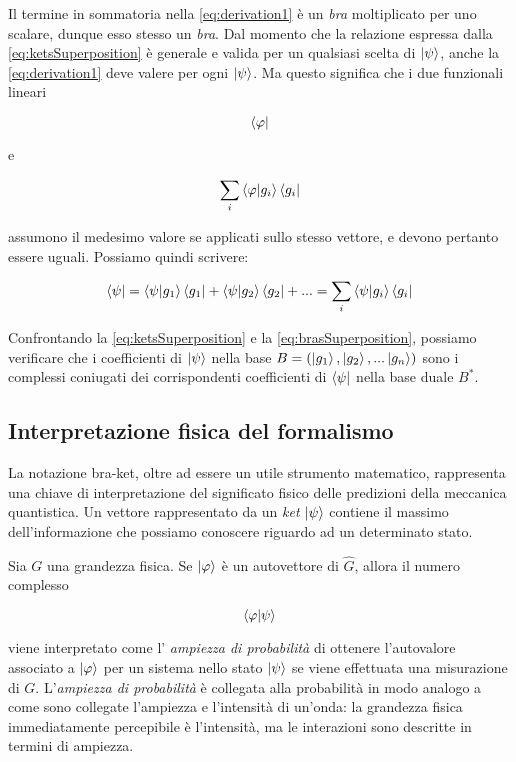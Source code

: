 Il termine in sommatoria nella \eqref{eq:derivation1} \`e un \textit{bra} moltiplicato per uno scalare, dunque esso stesso un \textit{bra}. Dal momento che la relazione espressa dalla \eqref{eq:ketsSuperposition} \`e generale e valida per un qualsiasi scelta di $\ket{\psi}$, anche la \eqref{eq:derivation1} deve valere per ogni $\ket{\psi}$. Ma questo significa che i due funzionali lineari

	\[
		\bra{\varphi}
	\]

e

	\[
		\sum_i \braket{\varphi}{g_i} \bra{g_i}
	\]


assumono il medesimo valore se applicati sullo stesso vettore, e devono pertanto essere uguali. Possiamo quindi scrivere:

	\begin{equation} \label{eq:brasSuperposition}
		\bra{\psi} = \braket{\psi}{g_1} \bra{g_1} + \braket{\psi}{g_2} \bra{g_2} + ... = \sum_i \braket{\psi}{g_i} \bra{g_i}
	\end{equation}

Confrontando la \eqref{eq:ketsSuperposition} e la \eqref{eq:brasSuperposition}, possiamo verificare che i coefficienti di $\ket{\psi}$ nella base $B = (\ket{g_1}, \ket{g_2},... \ket{g_n})$ sono i complessi coniugati dei corrispondenti coefficienti di $\bra{\psi}$ nella base duale $B^*$.

\subsection{Interpretazione fisica del formalismo}

La notazione bra-ket, oltre ad essere un utile strumento matematico, rappresenta una chiave di interpretazione del significato fisico delle predizioni della meccanica quantistica. Un vettore rappresentato da un \textit{ket} $\ket{\psi}$ contiene il massimo dell'informazione che possiamo conoscere riguardo ad un determinato stato. 

Sia $G$ una grandezza fisica. Se $\ket{\varphi}$ \`e un autovettore di $\hat{G}$, allora il numero complesso 

	\[
		\braket{\varphi}{\psi}
	\]

viene interpretato come l' \textit{ampiezza di probabilità} di ottenere l'autovalore associato a $\ket{\varphi}$ per un sistema nello stato $\ket{\psi}$ se viene effettuata una misurazione di $G$. L'\textit{ampiezza di probabilità} \`e collegata alla probabilità in modo analogo a come sono collegate l'ampiezza e l'intensità di un'onda: la grandezza fisica immediatamente percepibile \`e l'intensità, ma le interazioni sono descritte in termini di ampiezza.

